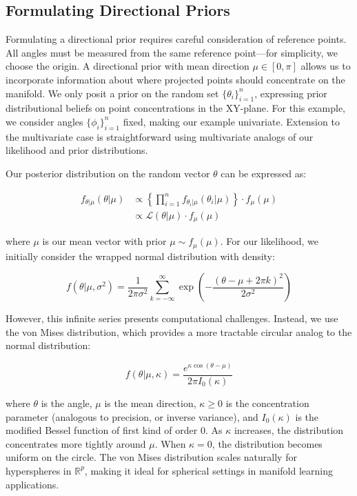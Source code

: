 \documentclass[twoside,11pt]{article}
\begin{document}
\subsection{Formulating Directional Priors}\label{sc:dir-priors}

Formulating a directional prior requires careful consideration of reference points. All angles must be measured from the same reference point—for simplicity, we choose the origin. A directional prior with mean direction $\mu \in [0, \pi]$ allows us to incorporate information about where projected points should concentrate on the manifold. We only posit a prior on the random set $\{\theta_i\}_{i=1}^n$, expressing prior distributional beliefs on point concentrations in the XY-plane. For this example, we consider angles $\{\phi_i\}_{i=1}^n$ fixed, making our example univariate. Extension to the multivariate case is straightforward using multivariate analogs of our likelihood and prior distributions.

Our posterior distribution on the random vector $\theta$ can be expressed as:

$$
\begin{aligned}
  f_{\theta | \mu} (\theta | \mu) 
  &\propto \left\{ \prod_{i=1}^n f_{\theta_i | \mu}(\theta_i | \mu) \right\} \cdot f_{\mu}(\mu) \\ 
  &\propto \mathcal{L}(\theta | \mu) \cdot f_{\mu}(\mu) 
\end{aligned}
$$

where $\mu$ is our mean vector with prior $\mu \sim f_{\mu}(\mu)$. For our likelihood, we initially consider the wrapped normal distribution with density:

$$
f(\theta|\mu,\sigma^2) = 
\frac{1}{2\pi\sigma^2} \sum_{k=-\infty}^{\infty} \exp\left(-\frac{(\theta-\mu+2\pi k)^2}{2\sigma^2}\right)
$$

However, this infinite series presents computational challenges. Instead, we use the von Mises distribution, which provides a more tractable circular analog to the normal distribution:

$$
f(\theta|\mu,\kappa) = \frac{e^{\kappa \cos(\theta-\mu)}}{2\pi I_0(\kappa)}
$$

where $\theta$ is the angle, $\mu$ is the mean direction, $\kappa \geq 0$ is the concentration parameter (analogous to precision, or inverse variance), and $I_0(\kappa)$ is the modified Bessel function of first kind of order 0. As $\kappa$ increases, the distribution concentrates more tightly around $\mu$. When $\kappa = 0$, the distribution becomes uniform on the circle. The von Mises distribution scales naturally for hyperspheres in $\mathbb{R}^p$, making it ideal for spherical settings in manifold learning applications.
\end{document}
